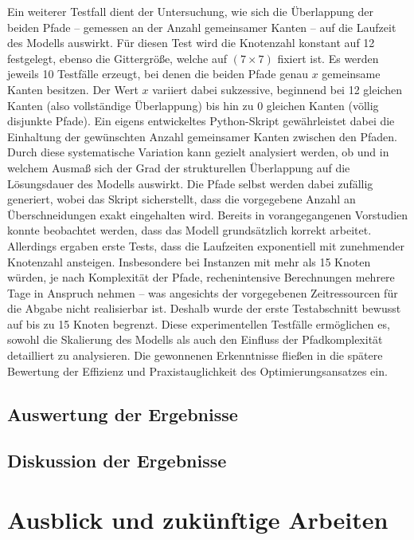 \documentclass[bachelor, german]{algothesis}
\begin{document}
Ein weiterer Testfall dient der Untersuchung, wie sich die Überlappung der beiden Pfade – gemessen an der Anzahl gemeinsamer Kanten – auf die Laufzeit des Modells auswirkt. Für diesen Test wird die Knotenzahl konstant auf 12 festgelegt, ebenso die Gittergröße, welche auf $(7 \times 7)$ fixiert ist. Es werden jeweils 10 Testfälle erzeugt, bei denen die beiden Pfade genau $x$ gemeinsame Kanten besitzen. Der Wert $x$ variiert dabei sukzessive, beginnend bei 12 gleichen Kanten (also vollständige Überlappung) bis hin zu 0 gleichen Kanten (völlig disjunkte Pfade). Ein eigens entwickeltes Python-Skript gewährleistet dabei die Einhaltung der gewünschten Anzahl gemeinsamer Kanten zwischen den Pfaden. Durch diese systematische Variation kann gezielt analysiert werden, ob und in welchem Ausmaß sich der Grad der strukturellen Überlappung auf die Lösungsdauer des Modells auswirkt. Die Pfade selbst werden dabei zufällig generiert, wobei das Skript sicherstellt, dass die vorgegebene Anzahl an Überschneidungen exakt eingehalten wird.
\newline
Bereits in vorangegangenen Vorstudien konnte beobachtet werden, dass das Modell grundsätzlich korrekt arbeitet. Allerdings ergaben erste Tests, dass die Laufzeiten exponentiell mit zunehmender Knotenzahl ansteigen. Insbesondere bei Instanzen mit mehr als 15 Knoten würden, je nach Komplexität der Pfade, rechenintensive Berechnungen mehrere Tage in Anspruch nehmen – was angesichts der vorgegebenen Zeitressourcen für die Abgabe nicht realisierbar ist. Deshalb wurde der erste Testabschnitt bewusst auf bis zu 15 Knoten begrenzt.\newline
Diese experimentellen Testfälle ermöglichen es, sowohl die Skalierung des Modells als auch den Einfluss der Pfadkomplexität detailliert zu analysieren. Die gewonnenen Erkenntnisse fließen in die spätere Bewertung der Effizienz und Praxistauglichkeit des Optimierungsansatzes ein.
\section{Auswertung der Ergebnisse}
\section{Diskussion der Ergebnisse}

\chapter{Ausblick und zukünftige Arbeiten}
\clearpage


\end{document}
